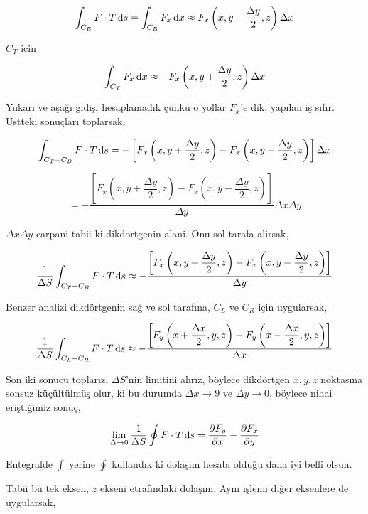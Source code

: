 \documentclass[12pt,fleqn]{article}\usepackage{../../common}
\begin{document}
$$
\int_{C_B} F \cdot T \,\mathrm{d} s =
\int_{C_B} F_x \,\mathrm{d} x \approx
F_x \left( x,y-\frac{\Delta y}{2}, z \right) \Delta x
$$

$C_T$ icin

$$
\int_{C_T} F_x \,\mathrm{d} x \approx -F_x \left(x,y+\frac{\Delta y}{2}, z \right) \Delta x
$$

Yukarı ve aşağı gidişi hesaplamadık çünkü o yollar $F_x$'e dik, yapılan iş
sıfır. Üstteki sonuçları toplarsak,

$$
\int_{C_T+C_B} F \cdot T \,\mathrm{d} s  = - \left[
F_x \left( x,y+\frac{\Delta y}{2},z \right) -
F_x \left( x,y-\frac{\Delta y}{2},z \right)
\right] \Delta x
$$

$$
= - \dfrac{
\left[
  F_x \left( x,y+\dfrac{\Delta y}{2},z \right) -
  F_x \left( x,y-\dfrac{\Delta y}{2},z \right)
\right]  
}{\Delta y}
\Delta x \Delta y
$$

$\Delta x \Delta y$ carpani tabii ki dikdortgenin alani. Onu sol tarafa alirsak,

$$
\frac{1}{\Delta S}\int_{C_T+C_B} F \cdot T \,\mathrm{d} s \approx
- \dfrac{
\left[
  F_x \left( x,y+\dfrac{\Delta y}{2},z \right) -
  F_x \left( x,y-\dfrac{\Delta y}{2},z \right)
\right]  
}{\Delta y}
$$

Benzer analizi dikdörtgenin sağ ve sol tarafına, $C_L$ ve $C_R$ için uygularsak,

$$
\frac{1}{\Delta S}\int_{C_L+C_R} F \cdot T \,\mathrm{d} s \approx
- \dfrac{
\left[
  F_y \left( x+\dfrac{\Delta x}{2},y,z \right) -
  F_y \left( x-\dfrac{\Delta x}{2},y,z \right)
\right]  
}{\Delta x}
$$

Son iki sonucu toplarız, $\Delta S$'nin limitini alırız, böylece dikdörtgen
$x,y,z$ noktasına sonsuz küçültülmüş olur, ki bu durumda $\Delta x \to 9$ ve
$\Delta y \to 0$, böylece nihai eriştiğimiz sonuç,

$$
\lim_{\Delta \to 0} \frac{1}{\Delta S} \oint F \cdot T \,\mathrm{d} s =
\frac{\partial F_y}{\partial x} - \frac{\partial F_x}{\partial y}
$$

Entegralde $\int$ yerine $\oint$ kullandık ki dolaşım hesabı olduğu daha iyi
belli olsun.

Tabii bu tek eksen, $z$ ekseni etrafındaki dolaşım. Aynı işlemi diğer eksenlere
de uygularsak,
\end{document}
